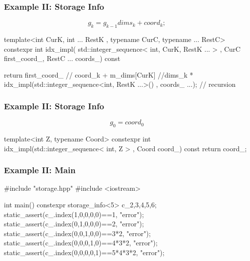 \documentclass[aspectratio=43]{beamer}
\begin{document}
\begin{frame}[fragile]\frametitle{Example II: Storage Info}
  $$
      g_k = g_{k-1} dims_{k} + coord_{k};
  $$
  \begin{Cpplisting}{}
template<int CurK, int ... RestK
         , typename CurC, typename ... RestC>
constexpr int idx_impl(
        std::integer_sequence< int,  CurK, RestK ... >
        , CurC first_coord_, RestC ... coords_) const {

  return first_coord_ // coord_k
  + m_dims[CurK] //dims_k
  * idx_impl(std::integer_sequence<int, RestK ...>()
             , coords_ ...); // recursion
}
  \end{Cpplisting}
\end{frame}


\begin{frame}[fragile]\frametitle{Example II: Storage Info}
$$
  g_0 = coord_0
$$
  \begin{Cpplisting}{}
template<int Z, typename Coord>
constexpr int idx_impl(std::integer_sequence< int, Z > , Coord coord_) const{
  return coord_;
}
  \end{Cpplisting}
\end{frame}


\begin{frame}[fragile]\frametitle{Example II: Main}
  \begin{Cpplisting}[: main ]{}
#include "storage.hpp"
#include <iostream>

int main(){
    constexpr storage_info<5> c_{2,3,4,5,6};
    static_assert(c_.index(1,0,0,0,0)==1, "error");
    static_assert(c_.index(0,1,0,0,0)==2, "error");
    static_assert(c_.index(0,0,1,0,0)==3*2, "error");
    static_assert(c_.index(0,0,0,1,0)==4*3*2, "error");
    static_assert(c_.index(0,0,0,0,1)==5*4*3*2, "error");
}
  \end{Cpplisting}
\end{frame}
\end{document}
